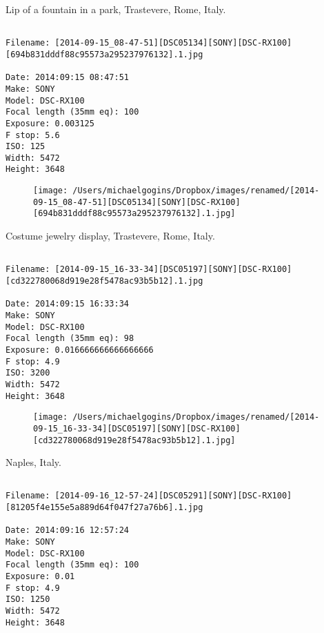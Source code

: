 \documentclass[11pt,letter,DIV=14,paper=landscape]{scrbook}
\begin{document}
\clearpage
\noindent Lip of a fountain in a park, Trastevere, Rome, Italy.
\noindent
\begin{lstlisting}

Filename: [2014-09-15_08-47-51][DSC05134][SONY][DSC-RX100][694b831dddf88c95573a295237976132].1.jpg

Date: 2014:09:15 08:47:51
Make: SONY
Model: DSC-RX100
Focal length (35mm eq): 100
Exposure: 0.003125
F stop: 5.6
ISO: 125
Width: 5472
Height: 3648
\end{lstlisting}
\clearpage

\begin{figure}
\texttt{[image: /Users/michaelgogins/Dropbox/images/renamed/[2014-09-15\_08-47-51][DSC05134][SONY][DSC-RX100][694b831dddf88c95573a295237976132].1.jpg]}
\end{figure}
    
\clearpage
\noindent Costume jewelry display, Trastevere, Rome, Italy.
\noindent
\begin{lstlisting}

Filename: [2014-09-15_16-33-34][DSC05197][SONY][DSC-RX100][cd322780068d919e28f5478ac93b5b12].1.jpg

Date: 2014:09:15 16:33:34
Make: SONY
Model: DSC-RX100
Focal length (35mm eq): 98
Exposure: 0.016666666666666666
F stop: 4.9
ISO: 3200
Width: 5472
Height: 3648
\end{lstlisting}
\clearpage

\begin{figure}
\texttt{[image: /Users/michaelgogins/Dropbox/images/renamed/[2014-09-15\_16-33-34][DSC05197][SONY][DSC-RX100][cd322780068d919e28f5478ac93b5b12].1.jpg]}
\end{figure}
    
\clearpage
\noindent Naples, Italy.
\noindent
\begin{lstlisting}

Filename: [2014-09-16_12-57-24][DSC05291][SONY][DSC-RX100][81205f4e155e5a889d64f047f27a76b6].1.jpg

Date: 2014:09:16 12:57:24
Make: SONY
Model: DSC-RX100
Focal length (35mm eq): 100
Exposure: 0.01
F stop: 4.9
ISO: 1250
Width: 5472
Height: 3648
\end{lstlisting}
\clearpage
\end{document}
